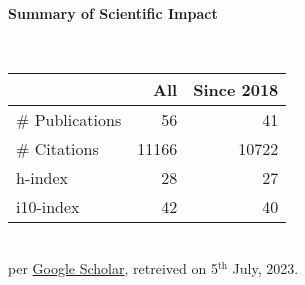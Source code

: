 \headedsection %
{\bf Summary of Scientific Impact}{}{}
{
    \qquad~~~~
    \begin{minipage}[t]{0.6\textwidth}
        \begin{tabular}{lrr}
        \hline
         & All & Since 2018\\
        \hline
        \# Publications & 56     & 41    \\
        \# Citations    & 11166  & 10722  \\
        h-index         & 28     & 27    \\
        i10-index       & 42     & 40    \\
        \hline
    \end{tabular}
    \\
    {\footnotesize{
        per \href{https://scholar.google.com/citations?user=wpLQuroAAAAJ}{Google Scholar},
        retreived on 5$^\text{th}$ July, 2023.
        }
    }
    \end{minipage}

}

